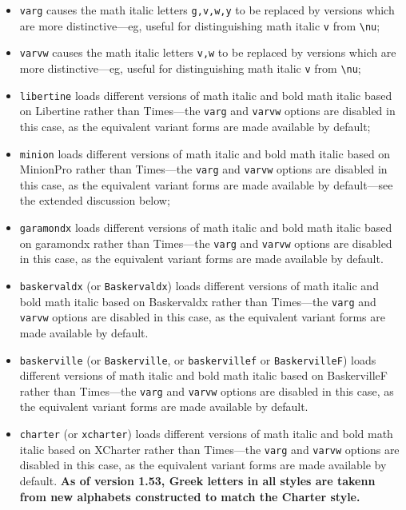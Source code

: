 \documentclass[11pt]{article}
\theoremstyle{oldplain}
\theoremstyle{plain}
\begin{document}
\begin{itemize}
\begin{verbatim}
\def\setSYdimens{\fontdimen16\font=2pt\fontdimen17\font=1.15\fontdimen17\font }
\end{verbatim}
Don't use these unless you know what you're doing.
\item {\tt varg} causes the math italic letters \verb|g,v,w,y| to be replaced by versions which are more distinctive---eg, useful for distinguishing math italic \verb|v| from \verb|\nu|;
\item {\tt varvw} causes the math italic letters \verb|v,w| to be replaced by versions which are more distinctive---eg, useful for distinguishing math italic \verb|v| from \verb|\nu|;
\item {\tt libertine} loads different versions of math italic and bold math italic based on \textsf{Libertine} rather than \textsf{Times}---the {\tt varg} and {\tt varvw} options are disabled in this case, as the equivalent variant forms are made available by default;
\item {\tt minion} loads different versions of math italic and bold math italic based on \textsf{MinionPro} rather than \textsf{Times}---the {\tt varg} and {\tt varvw} options are disabled in this case, as the equivalent variant forms are made available by default---see the extended discussion below;
\item {\tt garamondx} loads different versions of math italic and bold math italic based on \textsf{garamondx} rather than \textsf{Times}---the {\tt varg} and {\tt varvw} options are disabled in this case, as the equivalent variant forms are made available by default.
\item {\tt baskervaldx} (or {\tt Baskervaldx}) loads different versions of math italic and bold math italic based on \textsf{Baskervaldx} rather than \textsf{Times}---the {\tt varg} and {\tt varvw} options are disabled in this case, as the equivalent variant forms are made available by default.
\item {\tt baskerville} (or {\tt Baskerville}, or {\tt baskervillef} or {\tt BaskervilleF}) loads different versions of math italic and bold math italic based on \textsf{BaskervilleF} rather than \textsf{Times}---the {\tt varg} and {\tt varvw} options are disabled in this case, as the equivalent variant forms are made available by default.
\item {\tt charter} (or {\tt xcharter}) loads different versions of math italic and bold math italic based on \textsf{XCharter} rather than \textsf{Times}---the {\tt varg} and {\tt varvw} options are disabled in this case, as the equivalent variant forms are made available by default. \textbf{As of version 1.53, Greek letters in all styles are takenn from  new alphabets constructed to match the Charter style.}

\end{itemize}
\end{document}
